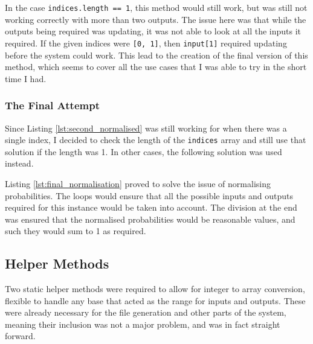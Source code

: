 \documentclass[report.tex]{subfiles}
\begin{document}
 

In the case \texttt{indices.length == 1}, this method would still work, but was
still not working correctly with more than two outputs. The issue here was that
while the outputs being required was updating, it was not able to look at all
the inputs it required. If the given indices were \texttt{[0, 1]}, then
\texttt{input[1]} required updating before the system could work. This lead to
the creation of the final version of this method, which seems to cover all the
use cases that I was able to try in the short time I had.

\subsubsection{The Final Attempt} %
\label{ssub:the_final_attempt}
Since Listing \ref{lst:second_normalised} was still working for when there was
a single index, I decided to check the length of the \texttt{indices} array and
still use that solution if the length was 1. In other cases, the following
solution was used instead.

 

Listing \ref{lst:final_normalisation} proved to solve the issue of normalising probabilities. The loops would ensure that all the possible inputs and outputs
required for this instance would be taken into account. The division at the end
was ensured that the normalised probabilities would be reasonable values, and
such they would sum to 1 as required.

\subsection{Helper Methods} %
\label{sub:helper_methods}
Two static helper methods were required to allow for integer to array
conversion, flexible to handle any base that acted as the range for inputs and
outputs. These were already necessary for the file generation and other parts
of the system, meaning their inclusion was not a major problem, and was in fact
straight forward.
\end{document}
